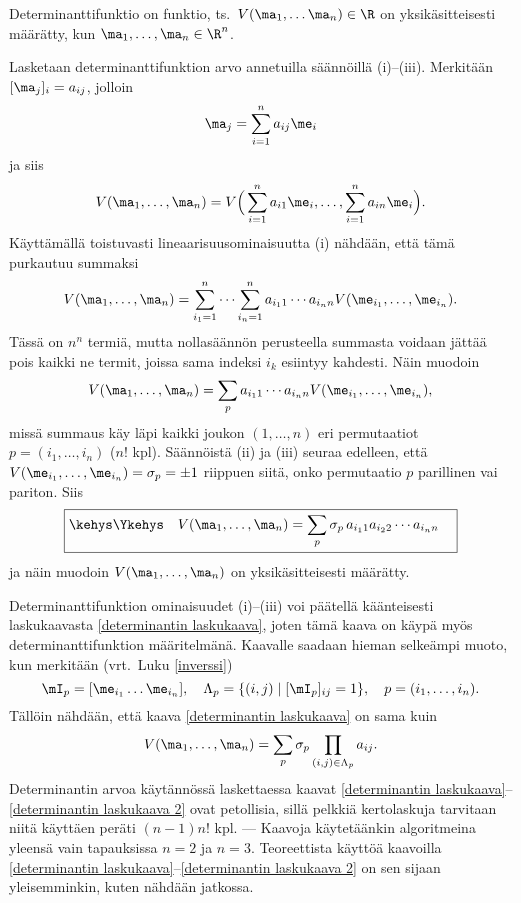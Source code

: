 \begin{Prop}
Determinanttifunktio on funktio, ts.\ $V(\ma_1,\ldots\ma_n)\in\R$ on yksikäsitteisesti määrätty,
kun $\ma_1,\ldots,\ma_n\in\R^n$.
\end{Prop}
\tod Lasketaan determinanttifunktion arvo annetuilla säännöillä (i)--(iii). Merkitään 
$[\ma_j]_i=a_{ij}$, jolloin
\[
\ma_j=\sum_{i=1}^n a_{ij}\me_i
\]
ja siis
\[
V(\ma_1,\ldots,\ma_n)=V\Bigl(\,\sum_{i=1}^n a_{i1}\me_i,\ldots,\sum_{i=1}^n a_{in}\me_i\Bigr).
\]
Käyttämällä toistuvasti lineaarisuusominaisuutta (i) nähdään, että tämä purkautuu summaksi
\[
V(\ma_1,\ldots,\ma_n)
=\sum_{i_1=1}^n\cdots\sum_{i_n=1}^n a_{i_11} \cdots a_{i_nn} V(\me_{i_1},\ldots,\me_{i_n}).
\]
Tässä on $n^n$ termiä, mutta nollasäännön perusteella summasta voidaan jättää pois kaikki ne 
termit, joissa sama indeksi $i_k$ esiintyy kahdesti. Näin muodoin
\[
V(\ma_1,\ldots,\ma_n)=\sum_p a_{i_11} \cdots a_{i_nn}V(\me_{i_1},\ldots,\me_{i_n}),
\]
missä summaus käy läpi kaikki joukon $(1,\ldots,n)$ eri permutaatiot $p=(i_1,\ldots,i_n)$
($n!$ kpl). Säännöistä (ii) ja (iii) seuraa edelleen, että 
$V(\me_{i_1},\ldots,\me_{i_n})=\sigma_p=\pm 1$ riippuen siitä, onko permutaatio $p$ parillinen
vai pariton. Siis
\begin{equation} \label{determinantin laskukaava}
\boxed{\kehys\Ykehys \quad V(\ma_1,\ldots,\ma_n)
                           =\sum_p\sigma_p\,a_{i_11}a_{i_22} \cdots a_{i_nn} \quad}
\end{equation}
ja näin muodoin $V(\ma_1,\ldots,\ma_n)$ on yksikäsitteisesti määrätty. \loppu

Determinanttifunktion ominaisuudet (i)--(iii) voi päätellä käänteisesti laskukaavasta
\eqref{determinantin laskukaava}, joten tämä kaava on käypä myös determinanttifunktion 
määritelmänä. Kaavalle saadaan hieman selkeämpi muoto, kun merkitään (vrt.\ Luku \ref{inverssi})
\[
\mI_p = [\me_{i_1} \ldots \me_{i_n}], \quad \Lambda_p = \{(i,j) \mid [\mI_p]_{ij}=1\}, \quad
                                                        p=(i_1, \ldots,i_n).
\]
Tällöin nähdään, että kaava \eqref{determinantin laskukaava} on sama kuin
\begin{equation} \label{determinantin laskukaava 2}
V(\ma_1,\ldots,\ma_n) = \sum_p \sigma_p \prod_{(i,j)\in\Lambda_p} a_{ij}.
\end{equation}
Determinantin arvoa käytännössä laskettaessa kaavat 
\eqref{determinantin laskukaava}--\eqref{determinantin laskukaava 2} ovat petollisia, sillä
pelkkiä kertolaskuja tarvitaan niitä käyttäen peräti $(n-1)n!$ kpl. --- Kaavoja käytetäänkin
algoritmeina yleensä vain tapauksissa $n=2$ ja $n=3$. Teoreettista käyttöä kaavoilla 
\eqref{determinantin laskukaava}--\eqref{determinantin laskukaava 2} on sen sijaan 
yleisemminkin, kuten nähdään jatkossa.

